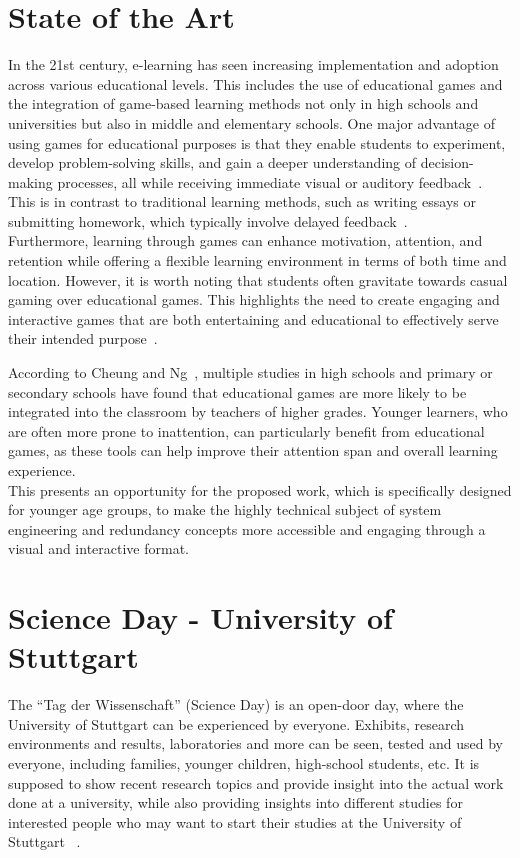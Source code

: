 \section{State of the Art}\label{sec:state-of-the-art}
In the 21st century, e-learning has seen increasing implementation and adoption across various educational levels.
This includes the use of educational games and the integration of game-based learning methods not only in
high schools and universities but also in middle and elementary schools.
One major advantage of using games for educational purposes is that they enable students to experiment,
develop problem-solving skills, and gain a deeper understanding of decision-making processes,
all while receiving immediate visual or auditory feedback~\cite{application-of-education-games-to-enhance-student-learning}.
This is in contrast to traditional learning methods, such as writing essays or submitting homework,
which typically involve delayed feedback~\cite{more-than-just-fun-and-games}.
\\
Furthermore, learning through games can enhance motivation, attention, and retention while offering a flexible learning environment
in terms of both time and location.
However, it is worth noting that students often gravitate towards casual gaming over educational games.
This highlights the need to create engaging and interactive games that are both entertaining and educational to
effectively serve their intended purpose~\cite{WHITTON}.

According to Cheung and Ng~\cite{application-of-education-games-to-enhance-student-learning}, multiple studies in high schools and primary or secondary schools have found that educational
games are more likely to be integrated into the classroom by teachers of higher grades.
Younger learners, who are often more prone to inattention, can particularly benefit from
educational games, as these tools can help improve their attention span and overall learning experience.
\\
This presents an opportunity for the proposed work, which is specifically designed for younger age groups, to make the highly
technical subject of system engineering and redundancy concepts more accessible and engaging through a visual and interactive format.

\section{Science Day - University of Stuttgart}\label{sec:science-day---university-of-stuttgart}
The ``Tag der Wissenschaft'' (Science Day) is an open-door day, where the University of Stuttgart can be experienced by everyone.
Exhibits, research environments and results, laboratories and more can be seen, tested and used by everyone, including families, younger children,
high-school students, etc.
It is supposed to show recent research topics and provide insight into the actual work done at a university, while also providing insights
into different studies for interested people who may want to start their studies at the University of Stuttgart ~\cite{tag-der-wissenschaft}.

